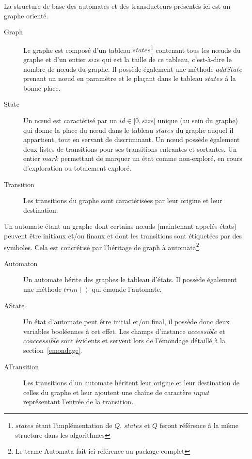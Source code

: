 	
	
	
	La structure de base des automates et des transducteurs présentés ici est un graphe orienté.
	\begin{description}
		\item[Graph] Le graphe est composé d'un tableau $states$\footnote{$states$ étant l'implémentation de $Q$, $states$ et $Q$ feront référence à la même structure dans les algorithmes} contenant tous les nœuds du graphe et d'un entier $size$ qui est la taille de ce tableau, c'est-à-dire le nombre de nœuds du graphe. Il possède également une méthode $addState$ prenant un nœud en paramètre et le plaçant dans le tableau $states$ à la bonne place.
		\item[State] Un nœud est caractérisé par un $id \in [0, size[$ unique (au sein du graphe) qui donne la place du nœud dans le tableau $states$ du graphe auquel il appartient, tout en servant de discriminant. Un nœud possède également deux listes de transitions pour ses transitions entrantes et sortantes. Un entier $mark$ permettant de marquer un état comme non-exploré, en cours d'exploration ou totalement exploré.
		\item[Transition] Les transitions du graphe sont caractérisées par leur origine et leur destination.  \\
	\end{description}
	
	Un automate étant un graphe dont certains nœuds (maintenant appelés états) peuvent être initiaux et/ou finaux et dont les transitions sont étiquetées par des symboles. Cela est concrétisé par l'héritage de graph à automata\footnote{Le terme Automata fait ici référence au package complet}.
	\begin{description}
		\item[Automaton] Un automate hérite des graphes le tableau d'états. Il possède également une méthode $trim()$ qui émonde l'automate.
		\item[AState] Un état d'automate peut être initial et/ou final, il possède donc deux variables booléennes à cet effet. Les champs d'instance $accessible$ et $coaccessible$ sont évidents et servent lors de l'émondage détaillé à la section~\ref{emondage}.
		\item[ATransition] Les transitions d'un automate héritent leur origine et leur destination de celles du graphe et leur ajoutent une chaîne de caractère $input$ représentant l'entrée de la transition. \\
	\end{description}
	
